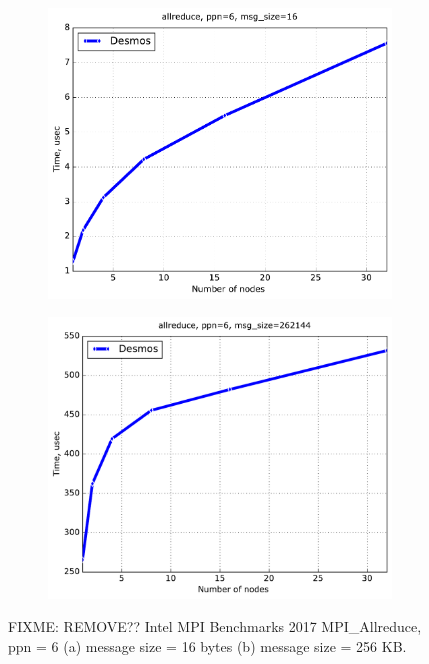 \documentclass{llncs}
\begin{document}
\begin{figure}[h!]
\centering
   \begin{subfigure}{0.48\textwidth}
  \includegraphics[width=1\textwidth]{img/allreduce_ppn=6_size=16.pdf}\caption{}
  \end{subfigure}
  \begin{subfigure}{0.48\textwidth}
  \includegraphics[width=1\textwidth]{img/allreduce_ppn=6_size=262144.pdf}\caption{}
   \end{subfigure}
\caption{FIXME: REMOVE?? Intel MPI Benchmarks 2017 MPI\_Allreduce, ppn = 6 (a) message size = 16 bytes (b) message size = 256 KB. }
\end{figure}
\end{document}
